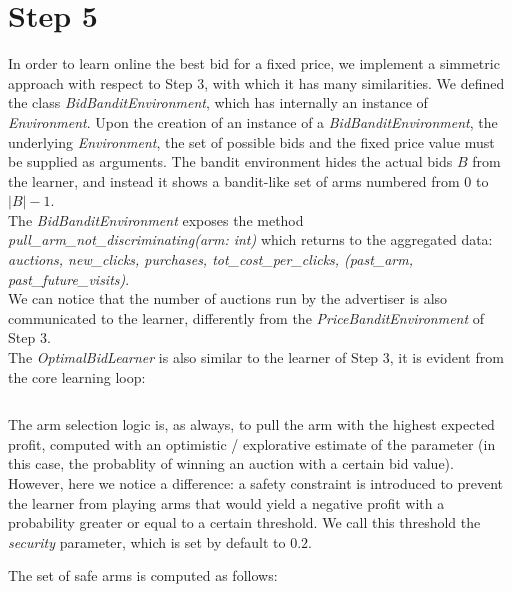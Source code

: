 \documentclass[11pt]{article} %
\begin{document}
\clearpage

{\footnotesize}

\clearpage
\section{Step 5}
In order to learn online the best bid for a fixed price, we implement a simmetric approach with respect to Step 3, with which it has  many similarities. We defined the class \textit{BidBanditEnvironment}, which has internally an instance of \textit{Environment}. Upon the creation of an instance of a \textit{BidBanditEnvironment}, the underlying \textit{Environment}, the set of possible bids and the fixed price value must be supplied as arguments. The bandit environment hides the actual bids $B$ from the learner, and instead it shows a bandit-like set of arms numbered from $0$ to $|B|-1$.\\

The \textit{BidBanditEnvironment} exposes the method \textit{pull\_arm\_not\_discriminating(arm: int)} which returns to the aggregated data:\\
\textit{auctions, new\_clicks, purchases, tot\_cost\_per\_clicks, (past\_arm, past\_future\_visits)}.\\
We can notice that the number of auctions run by the advertiser is also communicated to the learner, differently from the \textit{PriceBanditEnvironment} of Step 3.\\

The \textit{OptimalBidLearner} is also similar to the learner of Step 3, it is evident from the core learning loop:
\inputminted{python}{code/step5_learning_loop.py}
The arm selection logic is, as always, to pull the arm with the highest expected profit, computed with an optimistic / explorative estimate of the parameter (in this case, the probablity of winning an auction with a certain bid value). However, here we notice a difference: a safety constraint is introduced to prevent the learner from playing arms that would yield a negative profit with a probability greater or equal to a certain threshold. We call this threshold the \textit{security} parameter, which is set by default to $0.2$.\\

\begin{samepage}
The set of safe arms is computed as follows:
\inputminted{python}{code/step5_safety_constraint.py}
\end{samepage}
\end{document}
